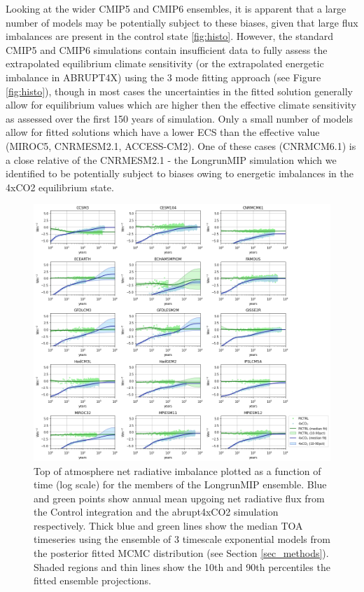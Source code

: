 \documentclass[esd, article]{copernicus}
\begin{document}
Looking at the wider CMIP5 and CMIP6 ensembles, it is apparent that a large number of models may be potentially subject to these biases, given that large flux imbalances are present in the control state \ref{fig:histo}.  However, the standard CMIP5 and CMIP6 simulations contain insufficient data to fully assess the extrapolated equilibrium climate sensitivity (or the extrapolated energetic imbalance in ABRUPT4X) using the 3 mode fitting approach (see Figure \ref{fig:histo}), though in most cases the uncertainties in the fitted solution generally allow for equilibrium values which are higher then the effective climate sensitivity as assessed over the first 150 years of simulation.  Only a small number of models allow for fitted solutions which have a lower ECS than the effective value (MIROC5, CNRMESM2.1, ACCESS-CM2).  One of these cases (CNRMCM6.1) is a close relative of the CNRMESM2.1 - the LongrunMIP simulation which we identified to be potentially subject to biases owing to energetic imbalances in the 4xCO2 equilibrium state.



\begin{figure}
    \centering
    \includegraphics[width=\linewidth]{extrap_lrmip.png}
    \caption{Top of atmosphere net radiative imbalance plotted as a function of time (log scale) for the members of the LongrunMIP ensemble.  Blue and green points show annual mean upgoing net radiative flux from the Control integration and the abrupt4xCO2 simulation respectively.  Thick blue and green lines show the median TOA timeseries using the ensemble of 3 timescale exponential models from the posterior fitted MCMC distribution (see Section \ref{sec_methods}).  Shaded regions and thin lines show the 10th and 90th percentiles the fitted ensemble projections.}
    \label{fig:extrap_lrmip}
\end{figure}
\end{document}
